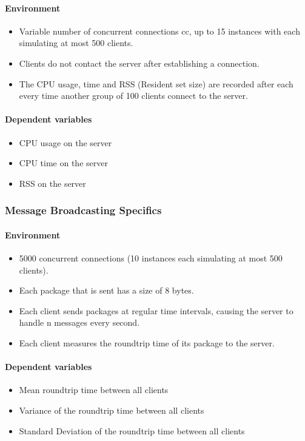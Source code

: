 \documentclass[bsc,frontabs,twoside,singlespacing,parskip,deptreport]{infthesis}     %
\begin{document}
\paragraph{Environment}
\begin{itemize}
\item Variable number of concurrent connections cc, up to 15 instances with each simulating at most 500 clients.
\item Clients do not contact the server after establishing a connection.
\item The CPU usage, time and RSS (Resident set size) are recorded after each every time another group of 100 clients connect to the server.
\end{itemize}
\paragraph{Dependent variables}
\begin{itemize}
\item CPU usage on the server
\item CPU time on the server
\item RSS on the server
\end{itemize}

\subsubsection{Message Broadcasting Specifics}
\paragraph{Environment}
\begin{itemize}
\item 5000 concurrent connections (10 instances each simulating at most 500 clients).
\item Each package that is sent has a size of 8 bytes.
\item Each client sends packages at regular time intervals, causing the server to handle n messages every second.
\item Each client measures the roundtrip time of its package to the server.
\end{itemize}

\paragraph{Dependent variables}
\begin{itemize}
\item Mean roundtrip time between all clients
\item Variance of the roundtrip time between all clients
\item Standard Deviation of the roundtrip time between all clients
\end{itemize}
\end{document}
